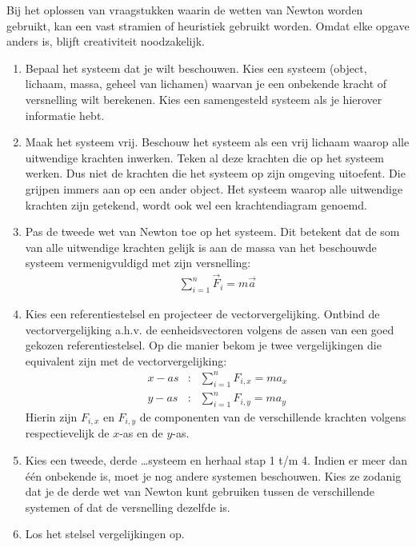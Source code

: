 Bij het oplossen van vraagstukken waarin de wetten van Newton worden gebruikt, kan een vast stramien of heuristiek gebruikt worden. Omdat elke opgave anders is, blijft creativiteit noodzakelijk.
\begin{enumerate}
\item Bepaal het systeem dat je wilt beschouwen. Kies een systeem (object, lichaam, massa, geheel van lichamen) waarvan je een onbekende kracht of versnelling wilt berekenen. Kies een samengesteld systeem als je hierover informatie hebt.
\item Maak het systeem vrij. Beschouw het systeem als een vrij lichaam waarop alle uitwendige krachten inwerken. Teken al deze krachten die op het systeem werken. Dus niet de krachten die het systeem op zijn omgeving uitoefent. Die grijpen immers aan op een ander object. Het systeem waarop alle uitwendige krachten zijn getekend, wordt ook wel een krachtendiagram genoemd.
\item Pas de tweede wet van Newton toe op het systeem. Dit betekent dat de som van alle uitwendige krachten gelijk is aan de massa van het beschouwde systeem vermenigvuldigd met zijn versnelling:
\begin{eqnarray*}
\sum_{i=1}^n\vec{F}_i=m\vec{a}
\end{eqnarray*}
\item Kies een referentiestelsel en projecteer de vectorvergelijking. Ontbind de vectorvergelijking a.h.v. de eenheidsvectoren volgens de assen van een goed gekozen referentiestelsel. Op die manier bekom je
twee vergelijkingen die equivalent zijn met de vectorvergelijking:
\begin{eqnarray*}
x-as&:&\sum_{i=1}^nF_{i,x}=ma_x\\
y-as&:&\sum_{i=1}^nF_{i,y}=ma_y
\end{eqnarray*}
Hierin zijn $F_{i,x}$ en $F_{i,y}$ de componenten van de verschillende krachten volgens respectievelijk de $x$-as en de $y$-as.
\item Kies een tweede, derde \ldots systeem en herhaal stap 1 t/m 4. Indien er meer dan \'e\'en onbekende is, moet je nog andere systemen beschouwen. Kies ze zodanig dat je de derde wet van Newton kunt gebruiken tussen de verschillende systemen of dat de versnelling dezelfde is.
\item Los het stelsel vergelijkingen op.
\end{enumerate}

\newpage


